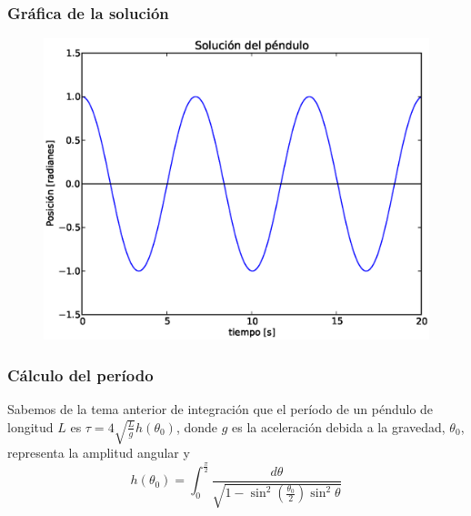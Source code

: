 \begin{frame}[fragile]
\frametitle{Gr\'{a}fica de la soluci\'{o}n}
\begin{figure}
	\centering
	\includegraphics[scale=0.5]{Problema1_01.eps} 
\end{figure}
\end{frame}
\begin{frame}
\frametitle{C\'{a}lculo del per\'{i}odo}
Sabemos de la tema anterior de integraci\'{o}n que el per\'{i}odo de un p\'{e}ndulo de longitud $L$ es $\tau = 4 \sqrt{\frac{L}{g}} h(\theta_{0})$, donde $g$ es la aceleraci\'{o}n debida a la gravedad, $\theta_{0}$, representa la amplitud angular y 
\[ h(\theta_{0}) =  \int_{0}^{\frac{\pi}{2}} \dfrac{d\theta}{\sqrt{1 - \sin^{2} \left( \frac{\theta_{0}}{2}\right) \sin^{2} \theta}} \]
\end{frame}
\begin{frame}

\end{frame}
